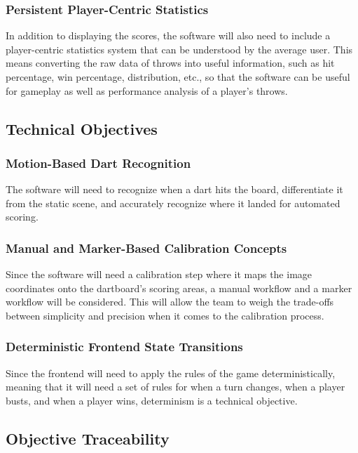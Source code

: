 \subsubsection{Persistent Player-Centric Statistics}

In addition to displaying the scores, the software will also need to include a player-centric statistics system that can be understood by the average user. This means converting the raw data of throws into useful information, such as hit percentage, win percentage, distribution, etc., so that the software can be useful for gameplay as well as performance analysis of a player's throws.

\subsection{Technical Objectives}

\subsubsection{Motion-Based Dart Recognition}

The software will need to recognize when a dart hits the board, differentiate it from the static scene, and accurately recognize where it landed for automated scoring.

\subsubsection{Manual and Marker-Based Calibration Concepts}

Since the software will need a calibration step where it maps the image coordinates onto the dartboard's scoring areas, a manual workflow and a marker workflow will be considered. This will allow the team to weigh the trade-offs between simplicity and precision when it comes to the calibration process.

\subsubsection{Deterministic Frontend State Transitions}

Since the frontend will need to apply the rules of the game deterministically, meaning that it will need a set of rules for when a turn changes, when a player busts, and when a player wins, determinism is a technical objective.

\subsection{Objective Traceability}


